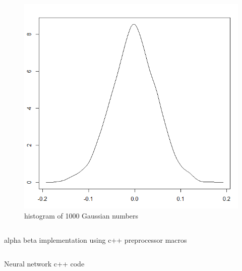 \documentclass{article}
\begin{document}
\begin{figure}
    \includegraphics[width=\linewidth]{images/gaussian-2.png}
    \caption{histogram of 1000 Gaussian numbers}
    \label{fig:gaussian-2}
\end{figure}

\begin{listing}[ht]
    \inputminted[linenos]{cpp}{code/search.cpp}
    \caption{alpha beta implementation using c++ preprocessor macros}
    \label{fig:ab-code}
\end{listing}

\begin{listing}[ht]
    \inputminted[linenos]{cpp}{code/network.cpp}
    \caption{Neural network c++ code}
    \label{fig:nn-code}
\end{listing}
\end{document}
